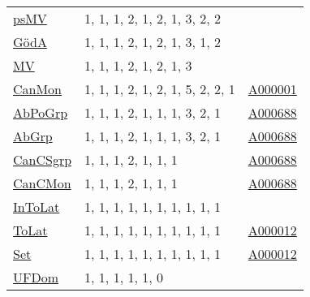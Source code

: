 {\begin{tabular}{|l|l|l|}
\hyperlink{psMV}{psMV}& 1, 1, 1, 2, 1, 2, 1, 3, 2, 2 &\\
\hyperlink{GödA}{GödA}& 1, 1, 1, 2, 1, 2, 1, 3, 1, 2 &\\
\hyperlink{MV}{MV}& 1, 1, 1, 2, 1, 2, 1, 3 &\\
\hyperlink{CanMon}{CanMon}& 1, 1, 1, 2, 1, 2, 1, 5, 2, 2, 1 &\href{http://oeis.org/A000001}{A000001}\\
\hyperlink{AbPoGrp}{AbPoGrp}& 1, 1, 1, 2, 1, 1, 1, 3, 2, 1 &\href{http://oeis.org/A000688}{A000688}\\
\hyperlink{AbGrp}{AbGrp}& 1, 1, 1, 2, 1, 1, 1, 3, 2, 1 &\href{http://oeis.org/A000688}{A000688}\\
\hyperlink{CanCSgrp}{CanCSgrp}& 1, 1, 1, 2, 1, 1, 1 &\href{http://oeis.org/A000688}{A000688}\\
\hyperlink{CanCMon}{CanCMon}& 1, 1, 1, 2, 1, 1, 1 &\href{http://oeis.org/A000688}{A000688}\\
\hyperlink{InToLat}{InToLat}& 1, 1, 1, 1, 1, 1, 1, 1, 1, 1 &\\
\hyperlink{ToLat}{ToLat}& 1, 1, 1, 1, 1, 1, 1, 1, 1, 1 &\href{http://oeis.org/A000012}{A000012}\\
\hyperlink{Set}{Set}& 1, 1, 1, 1, 1, 1, 1, 1, 1, 1 &\href{http://oeis.org/A000012}{A000012}\\
\hyperlink{UFDom}{UFDom}& 1, 1, 1, 1, 1, 0 &\\
\end{tabular}

}
